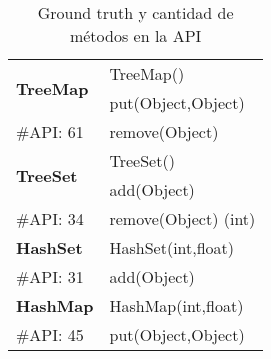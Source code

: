 \begin{table}[t!]
{\begin{tabular}{l l}
\multirow{2}{*}{\textbf{TreeMap}} 
 & TreeMap() \\
 & put(Object,Object) \\
{\scriptsize \#API: 61} & remove(Object) \\
\hline

\multirow{2}{*}{\textbf{TreeSet}} 
 & TreeSet() \\
 & add(Object) \\
{\scriptsize \#API: 34} & remove(Object) (int) \\
\hline

\multirow{1}{*}{\textbf{HashSet}} 
 & HashSet(int,float) \\
 {\scriptsize \#API: 31} & add(Object) \\
\hline

\multirow{1}{*}{\textbf{HashMap}} 
 & HashMap(int,float)  \\
{\scriptsize \#API: 45} & put(Object,Object)  \\
\hline

\end{tabular}%
}
\caption{Ground truth y cantidad de métodos en la API}
\label{tab:groundTruth}
\end{table}

